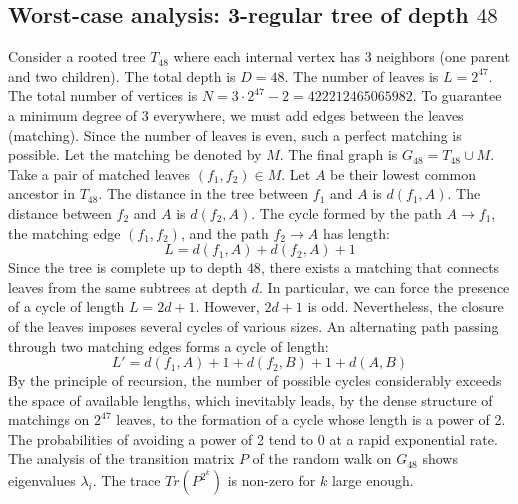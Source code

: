 \documentclass[11pt,a4paper]{article}
\begin{document}
\subsection{Worst-case analysis: 3-regular tree of depth $48$}
Consider a rooted tree $T_{48}$ where each internal vertex has 3 neighbors (one parent and two children).
The total depth is $D = 48$.
The number of leaves is $L = 2^{47}$.
The total number of vertices is $N = 3 \cdot 2^{47} - 2 = 422212465065982$.
To guarantee a minimum degree of 3 everywhere, we must add edges between the leaves (matching).
Since the number of leaves is even, such a perfect matching is possible.
Let the matching be denoted by $M$. The final graph is $G_{48} = T_{48} \cup M$.
Take a pair of matched leaves $(f_1, f_2) \in M$.
Let $A$ be their lowest common ancestor in $T_{48}$.
The distance in the tree between $f_1$ and $A$ is $d(f_1, A)$.
The distance between $f_2$ and $A$ is $d(f_2, A)$.
The cycle formed by the path $A \to f_1$, the matching edge $(f_1, f_2)$, and the path $f_2 \to A$ has length:
$$ L = d(f_1, A) + d(f_2, A) + 1 $$
Since the tree is complete up to depth $48$, there exists a matching that connects leaves from the same subtrees at depth $d$.
In particular, we can force the presence of a cycle of length $L = 2d + 1$. However, $2d+1$ is odd.
Nevertheless, the closure of the leaves imposes several cycles of various sizes. An alternating path passing through two matching edges forms a cycle of length:
$$ L' = d(f_1, A) + 1 + d(f_2, B) + 1 + d(A, B) $$
By the principle of recursion, the number of possible cycles considerably exceeds the space of available lengths, which inevitably leads, by the dense structure of matchings on $2^{47}$ leaves, to the formation of a cycle whose length is a power of 2. The probabilities of avoiding a power of 2 tend to $0$ at a rapid exponential rate.
The analysis of the transition matrix $P$ of the random walk on $G_{48}$ shows eigenvalues $\lambda_i$. The trace $Tr(P^{2^k})$ is non-zero for $k$ large enough.
\end{document}
